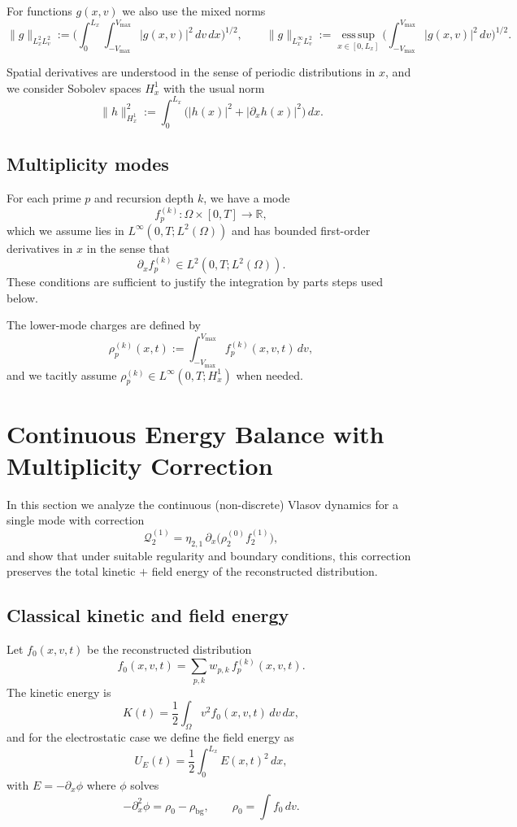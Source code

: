 \documentclass[11pt]{article}
\begin{document}
For functions $g(x,v)$ we also use the mixed norms
\[
  \|g\|_{L^2_x L^2_v}
  :=
  \Big(
    \int_0^{L_x}\!\!\int_{-V_{\max}}^{V_{\max}} |g(x,v)|^2\,dv\,dx
  \Big)^{1/2},
  \qquad
  \|g\|_{L^\infty_x L^2_v}
  :=
  \operatorname*{ess\,sup}_{x\in[0,L_x]}
  \Big(
    \int_{-V_{\max}}^{V_{\max}} |g(x,v)|^2\,dv
  \Big)^{1/2}.
\]

Spatial derivatives are understood in the sense of periodic distributions in
$x$, and we consider Sobolev spaces $H^1_x$ with the usual norm
\[
  \|h\|_{H^1_x}^2
  :=
  \int_0^{L_x} \big( |h(x)|^2 + |\partial_x h(x)|^2 \big)\,dx.
\]

\subsection{Multiplicity modes}

For each prime $p$ and recursion depth $k$, we have a mode
\[
  f_p^{(k)} : \Omega \times [0,T] \to \mathbb{R},
\]
which we assume lies in $L^\infty(0,T; L^2(\Omega))$ and has bounded
first-order derivatives in $x$ in the sense that
\[
  \partial_x f_p^{(k)} \in L^2(0,T; L^2(\Omega)).
\]
These conditions are sufficient to justify the integration by parts steps used
below.

The lower-mode charges are defined by
\[
  \rho_p^{(k)}(x,t) := \int_{-V_{\max}}^{V_{\max}} f_p^{(k)}(x,v,t)\,dv,
\]
and we tacitly assume $\rho_p^{(k)} \in L^\infty(0,T;H^1_x)$ when needed.

\section{Continuous Energy Balance with Multiplicity Correction}

In this section we analyze the continuous (non-discrete) Vlasov dynamics for a
single mode with correction
\[
  \mathcal{Q}_2^{(1)} = \eta_{2,1}\,\partial_x\big(\rho_2^{(0)} f_2^{(1)}\big),
\]
and show that under suitable regularity and boundary conditions, this
correction preserves the total kinetic $+$ field energy of the reconstructed
distribution.

\subsection{Classical kinetic and field energy}

Let $f_0(x,v,t)$ be the reconstructed distribution
\[
  f_0(x,v,t) = \sum_{p,k} w_{p,k}\,f_p^{(k)}(x,v,t).
\]
The kinetic energy is
\[
  K(t) = \frac12 \int_{\Omega} v^2 f_0(x,v,t)\,dv\,dx,
\]
and for the electrostatic case we define the field energy as
\[
  U_E(t) = \frac12 \int_0^{L_x} E(x,t)^2\,dx,
\]
with $E = -\partial_x \phi$ where $\phi$ solves
\[
  -\partial_x^2 \phi = \rho_0 - \rho_{\mathrm{bg}},
  \qquad
  \rho_0 = \int f_0\,dv.
\]
\end{document}
